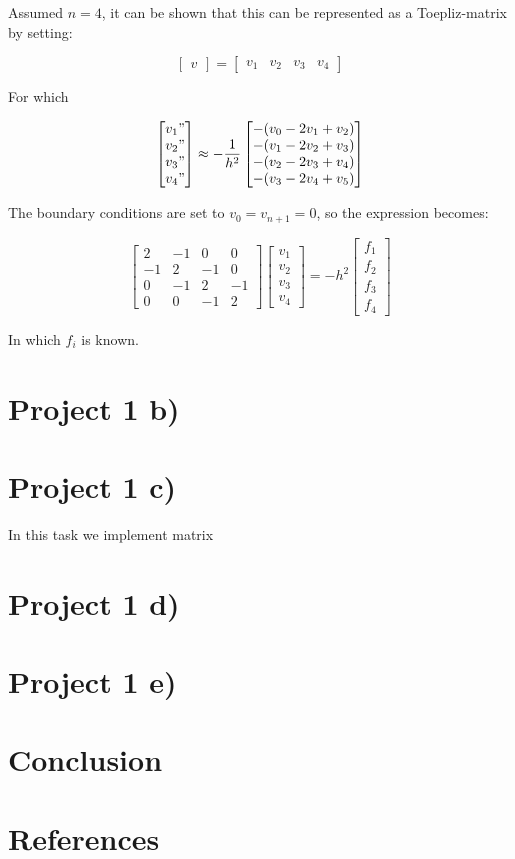 \documentclass{article}
\begin{document}
Assumed $n= 4$, it can be shown that this can be represented as a Toepliz-matrix by setting: 

\[
\begin{bmatrix}
	v
\end{bmatrix}
=
\begin{bmatrix}
	 v_1 & v_2 & v_3 & v_4
\end{bmatrix}
\]

For which 

\[
\begin{bmatrix}
	v_1" \\  v_2" \\ v_3" \\ v_4"
\end{bmatrix}
	\approx -\frac{1}{h^2}
\begin{bmatrix}
	-(v_{0} -2v_1 +v_2) \\
	-(v_1 -2v_2 +v_3) \\
	-(v_{2} -2v_3 +v_4) \\
	-(v_{3} -2v_4 +v_5) 
\end{bmatrix}
\]

The boundary conditions are set to $v_0 = v_{n+1} = 0$, so the expression becomes: 

\[
\begin{bmatrix}
	2 & -1 & 0 & 0 \\
	-1 & 2 & -1 & 0 \\
	0 & -1 & 2 & -1 \\
	0 & 0 & -1 & 2
\end{bmatrix}
\begin{bmatrix}
	v_1 \\  v_2 \\ v_3 \\ v_4
\end{bmatrix}
	= -h^2
\begin{bmatrix}
	f_1 \\
	f_2 \\
	f_3 \\
	f_4
\end{bmatrix}
\]

In which $f_i$ is known. 

\section{Project 1 b)}

\section{Project 1 c)}
In this task we implement matrix 

\section{Project 1 d)}

\section{Project 1 e)}


\section{Conclusion}

\section{References}
\end{document}
